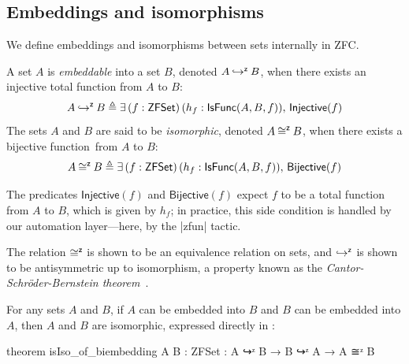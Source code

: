 \subsection{Embeddings and isomorphisms}
We define embeddings and isomorphisms between sets internally in ZFC.
\begin{definition}
  A set $A$ is \emph{embeddable} into a set $B$, denoted $A \mathbin{\mathsf{\hookrightarrow}^{\mathsf{z}}} B$, when there exists an injective total function from $A$ to $B$:
  \[
    A \mathbin{\mathsf{\hookrightarrow}^{\mathsf{z}}} B \triangleq \exists\, (f : \mathsf{ZFSet})\, (h_f : \mathsf{IsFunc}(A,B,f)),\, \mathsf{Injective}(f)
  \]
  The sets $A$ and $B$ are said to be \emph{isomorphic}, denoted $A \mathbin{\mathsf{\cong}^{\mathsf{z}}} B$, when there exists a bijective function\footnotemark\ from $A$ to $B$:
  \[
    A \mathbin{\mathsf{\cong}^{\mathsf{z}}} B \triangleq \exists\, (f : \mathsf{ZFSet})\, (h_f : \mathsf{IsFunc}(A,B,f)),\, \mathsf{Bijective}(f)
  \]
\end{definition}
\begin{remark}
  The predicates $\mathsf{Injective}(f)$ and $\mathsf{Bijective}(f)$ expect $f$ to be a total function from $A$ to $B$, which is given by $h_f$; in practice, this side condition is handled by our automation layer---here, by the \inlinelean|zfun| tactic.
\end{remark}
The relation $\mathbin{\mathsf{\cong}^{\mathsf{z}}}$ is shown to be an equivalence relation on sets, and $\mathbin{\mathsf{\hookrightarrow}^{\mathsf{z}}}$ is shown to be antisymmetric up to isomorphism, a property known as the \emph{Cantor-Schr\"{o}der-Bernstein theorem}~\cite{CSB_thm}.
\begin{theorem}
  For any sets \(A\) and \(B\), if \(A\) can be embedded into \(B\) and \(B\) can be embedded into \(A\), then \(A\) and \(B\) are isomorphic, \ie expressed directly in \zflean:
  \begin{leanlisting}
theorem isIso_of_biembedding {A B : ZFSet} : A ↪ᶻ B → B ↪ᶻ A → A ≅ᶻ B
\end{leanlisting}
\end{theorem}
